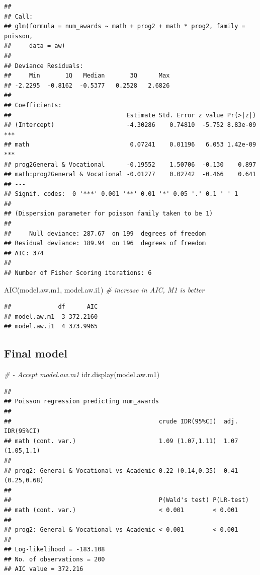 \documentclass[
]{book}
\makeatletter
\newenvironment{Shaded}{\begin{snugshade}}{\end{snugshade}}
\newcommand{\CommentTok}[1]{\textcolor[rgb]{0.37,0.37,0.37}{\textit{#1}}}
\newcommand{\FunctionTok}[1]{\textcolor[rgb]{0,0,0}{#1}}
\newcommand{\NormalTok}[1]{#1}
\newenvironment{kframe}{%
\medskip{}
\setlength{\fboxsep}{.8em}
 \def\at@end@of@kframe{}%
 \ifinner\ifhmode%
  \def\at@end@of@kframe{\end{minipage}}%
  \begin{minipage}{\columnwidth}%
 \fi\fi%
 \def\FrameCommand##1{\hskip\@totalleftmargin \hskip-\fboxsep
 \colorbox{shadecolor}{##1}\hskip-\fboxsep
     \hskip-\linewidth \hskip-\@totalleftmargin \hskip\columnwidth}%
 \MakeFramed {\advance\hsize-\width
   \@totalleftmargin\z@ \linewidth\hsize
   \@setminipage}}%
 {\par\unskip\endMakeFramed%
 \at@end@of@kframe}
\renewenvironment{Shaded}{\begin{kframe}}{\end{kframe}}
\makeatother
\begin{document}
\begin{verbatim}
## 
## Call:
## glm(formula = num_awards ~ math + prog2 + math * prog2, family = poisson, 
##     data = aw)
## 
## Deviance Residuals: 
##     Min       1Q   Median       3Q      Max  
## -2.2295  -0.8162  -0.5377   0.2528   2.6826  
## 
## Coefficients:
##                                Estimate Std. Error z value Pr(>|z|)    
## (Intercept)                    -4.30286    0.74810  -5.752 8.83e-09 ***
## math                            0.07241    0.01196   6.053 1.42e-09 ***
## prog2General & Vocational      -0.19552    1.50706  -0.130    0.897    
## math:prog2General & Vocational -0.01277    0.02742  -0.466    0.641    
## ---
## Signif. codes:  0 '***' 0.001 '**' 0.01 '*' 0.05 '.' 0.1 ' ' 1
## 
## (Dispersion parameter for poisson family taken to be 1)
## 
##     Null deviance: 287.67  on 199  degrees of freedom
## Residual deviance: 189.94  on 196  degrees of freedom
## AIC: 374
## 
## Number of Fisher Scoring iterations: 6
\end{verbatim}

\begin{Shaded}
\begin{Highlighting}[]
\FunctionTok{AIC}\NormalTok{(model.aw.m1, model.aw.i1)  }\CommentTok{\# increase in AIC, M1 is better}
\end{Highlighting}
\end{Shaded}

\begin{verbatim}
##             df      AIC
## model.aw.m1  3 372.2160
## model.aw.i1  4 373.9965
\end{verbatim}

\hypertarget{final-model}{%
\subsection{Final model}\label{final-model}}

\begin{Shaded}
\begin{Highlighting}[]
\CommentTok{\# {-} Accept model.aw.m1}
\FunctionTok{idr.display}\NormalTok{(model.aw.m1)}
\end{Highlighting}
\end{Shaded}

\begin{verbatim}
## 
## Poisson regression predicting num_awards 
##  
##                                         crude IDR(95%CI)  adj. IDR(95%CI)  
## math (cont. var.)                       1.09 (1.07,1.11)  1.07 (1.05,1.1)  
##                                                                            
## prog2: General & Vocational vs Academic 0.22 (0.14,0.35)  0.41 (0.25,0.68) 
##                                                                            
##                                         P(Wald's test) P(LR-test)
## math (cont. var.)                       < 0.001        < 0.001   
##                                                                  
## prog2: General & Vocational vs Academic < 0.001        < 0.001   
##                                                                  
## Log-likelihood = -183.108
## No. of observations = 200
## AIC value = 372.216
\end{verbatim}
\end{document}
